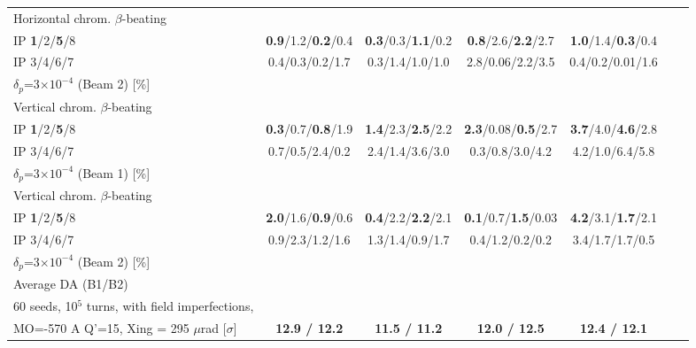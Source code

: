 \documentclass{cernatsnote}
\begin{document}
\begin{landscape}
\begin{table}[h!]
\begin{center}
\begin{tabular}{|l|c|c|c|c|c|c|}
Horizontal chrom. $\beta$-beating    &               &            &           &            \\
IP \textbf{1}/2/\textbf{5}/8 &   \textbf{0.9}/1.2/\textbf{0.2}/0.4 &    \textbf{0.3}/0.3/\textbf{1.1}/0.2        &    \textbf{0.8}/2.6/\textbf{2.2}/2.7  &      \textbf{1.0}/1.4/\textbf{0.3}/0.4    \\
IP 3/4/6/7 & 0.4/0.3/0.2/1.7 &   0.3/1.4/1.0/1.0         &    2.8/0.06/2.2/3.5  &      0.4/0.2/0.01/1.6     \\
$\delta_{p}$=3$\times10^{-4}$ (Beam 2) [\%]  &   &            &     &          \\\hline


Vertical chrom. $\beta$-beating  &               &            &           &            \\
IP \textbf{1}/2/\textbf{5}/8 & \textbf{0.3}/0.7/\textbf{0.8}/1.9     &    \textbf{1.4}/2.3/\textbf{2.5}/2.2        &    \textbf{2.3}/0.08/\textbf{0.5}/2.7   &     \textbf{3.7}/4.0/\textbf{4.6}/2.8     \\
IP 3/4/6/7 & 0.7/0.5/2.4/0.2     &    2.4/1.4/3.6/3.0        &   0.3/0.8/3.0/4.2   &     4.2/1.0/6.4/5.8     \\
$\delta_{p}$=3$\times10^{-4}$ (Beam 1) [\%]  &      &            &      &             \\\hline


Vertical chrom. $\beta$-beating  &               &            &           &                    \\
IP \textbf{1}/2/\textbf{5}/8 &   \textbf{2.0}/1.6/\textbf{0.9}/0.6      &    \textbf{0.4}/2.2/\textbf{2.2}/2.1        & \textbf{0.1}/0.7/\textbf{1.5}/0.03       &     \textbf{4.2}/3.1/\textbf{1.7}/2.1      \\
IP 3/4/6/7 &   0.9/2.3/1.2/1.6    &     1.3/1.4/0.9/1.7       & 0.4/1.2/0.2/0.2      &     3.4/1.7/1.7/0.5     \\
$\delta_{p}$=3$\times10^{-4}$ (Beam 2) [\%]  &       &                &          \\\hline


Average DA (B1/B2)  &               &            &           &                  \\
60 seeds, 10$^{5}$ turns, with field imperfections,  &               &            &           &                \\
 MO=-570 A  Q'=15, Xing = 295 $\mu$rad [$\sigma$]  &       \textbf{12.9 / 12.2}        &    \textbf{11.5 / 11.2}       &     \textbf{12.0  / 12.5}      &         \textbf{12.4 / 12.1}           \\ \hline


\end{tabular}
\end{center}
\end{table}
\end{landscape}
\end{document}
